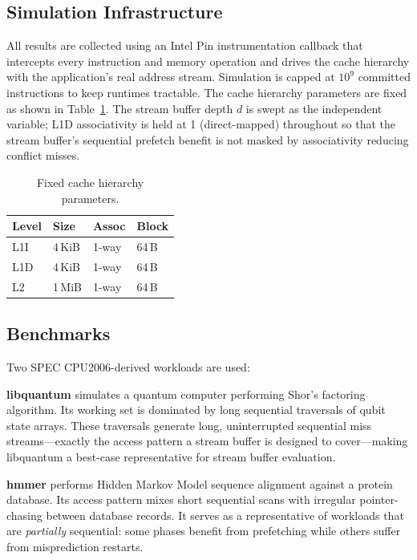 \documentclass[10pt,twocolumn]{article}
\begin{document}
\subsection{Simulation Infrastructure}

All results are collected using an Intel Pin instrumentation callback
that intercepts every instruction and memory operation and drives the
cache hierarchy with the application's real address stream. Simulation
is capped at $10^9$ committed instructions to keep runtimes tractable.
The cache hierarchy parameters are fixed as shown in Table~\ref{tab:config}.
The stream buffer depth $d$ is swept as the independent variable; L1D
associativity is held at 1 (direct-mapped) throughout so that the stream
buffer's sequential prefetch benefit is not masked by associativity
reducing conflict misses.

\begin{table}[H]
\centering
\caption{Fixed cache hierarchy parameters.}
\label{tab:config}
\begin{tabular}{llll}
\toprule
Level & Size   & Assoc  & Block \\
\midrule
L1I   & 4\,KiB  & 1-way  & 64\,B \\
L1D   & 4\,KiB  & 1-way  & 64\,B \\
L2    & 1\,MiB  & 1-way  & 64\,B \\
\bottomrule
\end{tabular}
\end{table}

\subsection{Benchmarks}

Two SPEC CPU2006-derived workloads are used:

\textbf{libquantum} simulates a quantum computer performing Shor's
factoring algorithm. Its working set is dominated by long sequential
traversals of qubit state arrays. These traversals generate long,
uninterrupted sequential miss streams---exactly the access pattern a
stream buffer is designed to cover---making libquantum a
best-case representative for stream buffer evaluation.

\textbf{hmmer} performs Hidden Markov Model sequence alignment against
a protein database. Its access pattern mixes short sequential scans
with irregular pointer-chasing between database records. It serves as
a representative of workloads that are \textit{partially} sequential:
some phases benefit from prefetching while others suffer from
misprediction restarts.
\end{document}
